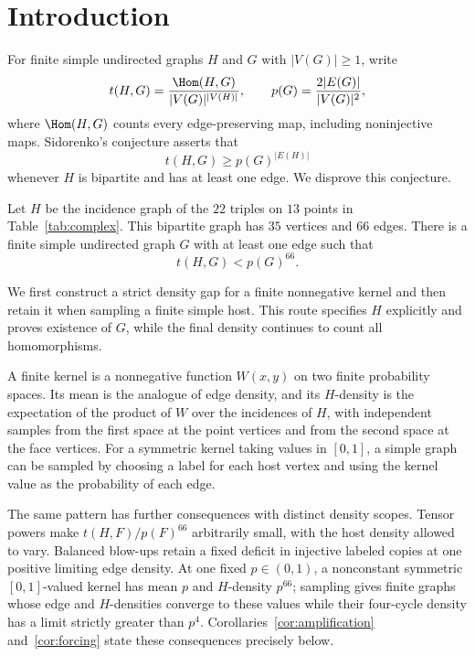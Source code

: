 \section{Introduction}\label{sec:introduction}

For finite simple undirected graphs \(H\) and \(G\) with
\(|V(G)|\ge1\), write
\[
t(H,G)=\frac{\Hom(H,G)}{|V(G)|^{|V(H)|}},
\qquad
p(G)=\frac{2|E(G)|}{|V(G)|^2},
\]
where \(\Hom(H,G)\) counts every edge-preserving map, including
noninjective maps. Sidorenko's conjecture asserts that
\begin{equation}\label{eq:sidorenko}
t(H,G)\ge p(G)^{|E(H)|}
\end{equation}
whenever \(H\) is bipartite and has at least one edge.
We disprove this conjecture.

\begin{theorem}\label{thm:main}
Let \(H\) be the incidence graph of the \(22\) triples on \(13\) points
in Table~\ref{tab:complex}. This bipartite graph has \(35\) vertices
and \(66\) edges. There is a finite simple undirected graph \(G\)
with at least one edge such that
\[
t(H,G)<p(G)^{66}.
\]
\end{theorem}

We first construct a strict density gap for a finite nonnegative
kernel and then retain it when sampling a finite simple host. This
route specifies \(H\) explicitly and proves existence of \(G\), while
the final density continues to count all homomorphisms.

A finite kernel is a nonnegative function \(W(x,y)\) on two finite
probability spaces. Its mean is the analogue of edge density, and its
\(H\)-density is the expectation of the product of \(W\) over the
incidences of \(H\), with independent samples from the first space at
the point vertices and from the second space at the face vertices.
For a symmetric kernel taking values in \([0,1]\), a simple graph
can be sampled by choosing a label for each host vertex and using the
kernel value as the probability of each edge.

The same pattern has further consequences with distinct density
scopes. Tensor powers make \(t(H,F)/p(F)^{66}\) arbitrarily small,
with the host density allowed to vary. Balanced blow-ups retain a
fixed deficit in injective labeled copies at one positive limiting
edge density. At one fixed \(p\in(0,1)\), a nonconstant symmetric
\([0,1]\)-valued kernel has mean \(p\) and \(H\)-density \(p^{66}\);
sampling gives finite graphs whose edge and \(H\)-densities converge
to these values while their four-cycle density has a limit strictly
greater than \(p^4\).
Corollaries~\ref{cor:amplification} and~\ref{cor:forcing} state these
consequences precisely below.

